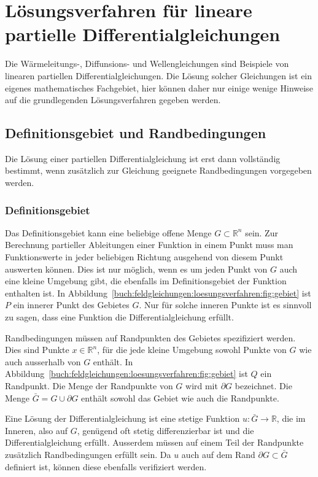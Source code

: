 %
%
\section{Lösungsverfahren für lineare partielle Differentialgleichungen}
Die Wärmeleitungs-, Diffunsions- und Wellengleichungen sind Beispiele
von linearen partiellen Differentialgleichungen.
Die Lösung solcher Gleichungen ist ein eigenes mathematisches
Fachgebiet, hier können daher nur einige wenige Hinweise auf die
grundlegenden Lösungsverfahren gegeben werden.

%
%
\subsection{Definitionsgebiet und Randbedingungen}
%
Die Lösung einer partiellen Differentialgleichung ist erst dann vollständig
bestimmt, wenn zusätzlich zur Gleichung geeignete Randbedingungen
vorgegeben werden.

%
%
\subsubsection{Definitionsgebiet}
Das Definitionsgebiet kann eine beliebige offene Menge $G\subset\mathbb{R}^n$
sein.
Zur Berechnung partieller Ableitungen einer Funktion in einem Punkt
muss man Funktionswerte in jeder beliebigen Richtung ausgehend von
diesem Punkt auswerten können.
Dies ist nur möglich, wenn es um jeden Punkt von $G$ auch eine kleine
Umgebung gibt, die ebenfalls im Definitionsgebiet der Funktion enthalten
ist.
In Abbildung~\ref{buch:feldgleichungen:loesungsverfahren:fig:gebiet}
ist $P$ ein innerer Punkt des Gebietes $G$.
Nur für solche inneren Punkte ist es sinnvoll zu sagen, dass eine
Funktion die Differentialgleichung erfüllt.

Randbedingungen müssen auf Randpunkten des Gebietes spezifiziert werden.
Dies sind Punkte $x\in\mathbb{R}^n$, für die jede kleine Umgebung sowohl
Punkte von $G$ wie auch ausserhalb von $G$ enthält.
In Abbildung~\ref{buch:feldgleichungen:loesungsverfahren:fig:gebiet}
ist $Q$ ein Randpunkt.
Die Menge der Randpunkte von $G$ wird mit $\partial G$ bezeichnet.
Die Menge $\bar{G}=G\cup \partial G$ enthält sowohl das Gebiet
wie auch die Randpunkte.

Eine Lösung der Differentialgleichung ist eine stetige Funktion
$u\colon\bar{G}\to\mathbb{R}$, die im Inneren, also auf $G$,
genügend oft stetig differenzierbar ist und
die Differentialgleichung erfüllt.
Ausserdem müssen auf einem Teil der Randpunkte zusätzlich
Randbedingungen erfüllt sein.
Da $u$ auch auf dem Rand $\partial G\subset\bar{G}$ definiert
ist, können diese ebenfalls verifiziert werden.


